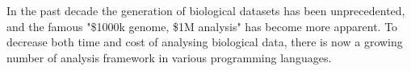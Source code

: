 %


    

%





In the past decade the generation of biological datasets has been unprecedented,
and the famous "\$1000k genome, \$1M analysis"\cite{} has become more apparent.
To decrease both time and cost of analysing biological data, there is now a
growing number of analysis framework in various programming languages.\cite{}

